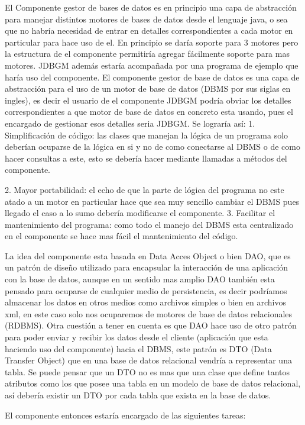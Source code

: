 El Componente gestor de bases de datos es en principio una capa de abstracción para manejar distintos motores de bases de datos desde el lenguaje java, o sea que no habría necesidad de entrar en detalles correspondientes a cada motor en particular para hace uso de el. En principio se daría soporte para 3 motores pero  la estructura de el componente permitiría agregar fácilmente soporte para mas motores. JDBGM además estaría acompañada por una programa de ejemplo que haría uso del componente.
 El componente gestor de base  de datos es una capa de abstracción para el uso de un motor de base de datos (DBMS por sus siglas en ingles), es decir el usuario de el componente JDBGM podría obviar los detalles correspondientes a que motor de base de datos en concreto esta usando, pues el encargado de gestionar esos detalles seria JDBGM. Se lograría así:
1. Simplificación de código: las clases que manejan la lógica de un programa solo deberían ocuparse de la lógica en si y no de como conectarse al DBMS o de como hacer consultas a este, esto se debería hacer mediante llamadas a métodos del componente.

2. Mayor portabilidad: el echo de que la parte de lógica del programa no este atado a un motor en particular hace que sea muy sencillo cambiar el DBMS pues llegado el caso a lo sumo debería modificarse el componente.
3. Facilitar el mantenimiento del programa: como todo el manejo del DBMS esta centralizado en el componente se hace mas fácil el mantenimiento del código.

La idea del componente esta basada en Data Acces Object o bien DAO, que es un patrón de diseño utilizado para encapsular la interacción de una aplicación con la base de datos, aunque en un sentido mas amplio DAO también esta pensado para ocuparse de cualquier medio de persistencia, es decir podríamos almacenar los datos en otros medios como archivos simples o bien en archivos xml, en este caso solo nos ocuparemos de motores de base de datos relacionales (RDBMS). Otra cuestión a tener en cuenta es que DAO hace uso de otro patrón para poder enviar y recibir los datos desde el cliente (aplicación que esta haciendo uso del componente) hacia el DBMS, este patrón es DTO  (Data Transfer Object) que en una base de datos relacional vendría a representar una tabla. Se puede pensar que un DTO no es mas que una clase que define tantos atributos como los que posee una tabla en un  modelo de base de datos relacional, así debería existir un DTO por cada tabla que exista en la    base de datos. 

El componente entonces estaría encargado de las siguientes tareas:

